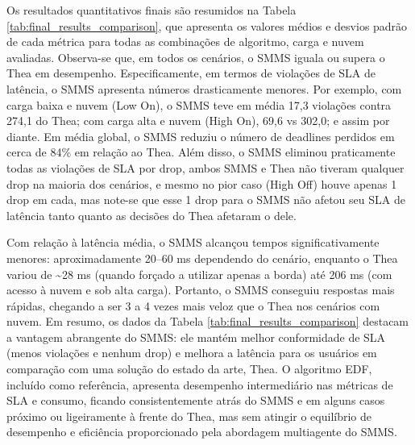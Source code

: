 Os resultados quantitativos finais são resumidos na Tabela \ref{tab:final_results_comparison}, que apresenta os valores médios e desvios padrão de cada métrica para todas as combinações de algoritmo, carga e nuvem avaliadas. Observa-se que, em todos os cenários, o SMMS iguala ou supera o Thea em desempenho. Especificamente, em termos de violações de SLA de latência, o SMMS apresenta números drasticamente menores. Por exemplo, com carga baixa e nuvem (Low On), o SMMS teve em média 17,3 violações contra 274,1 do Thea; com carga alta e nuvem (High On), 69,6 vs 302,0; e assim por diante. Em média global, o SMMS reduziu o número de deadlines perdidos em cerca de 84\% em relação ao Thea. Além disso, o SMMS eliminou praticamente todas as violações de SLA por drop, ambos SMMS e Thea não tiveram qualquer drop na maioria dos cenários, e mesmo no pior caso (High Off) houve apenas 1 drop em cada, mas note-se que esse 1 drop para o SMMS não afetou seu SLA de latência tanto quanto as decisões do Thea afetaram o dele.

Com relação à latência média, o SMMS alcançou tempos significativamente menores: aproximadamente 20–60 ms dependendo do cenário, enquanto o Thea variou de \textasciitilde28 ms (quando forçado a utilizar apenas a borda) até 206 ms (com acesso à nuvem e sob alta carga). Portanto, o SMMS conseguiu respostas mais rápidas, chegando a ser 3 a 4 vezes mais veloz que o Thea nos cenários com nuvem. Em resumo, os dados da Tabela \ref{tab:final_results_comparison} destacam a vantagem abrangente do SMMS: ele mantém melhor conformidade de SLA (menos violações e nenhum drop) e melhora a latência para os usuários em comparação com uma solução do estado da arte, Thea. O algoritmo EDF, incluído como referência, apresenta desempenho intermediário nas métricas de SLA e consumo, ficando consistentemente atrás do SMMS e em alguns casos próximo ou ligeiramente à frente do Thea, mas sem atingir o equilíbrio de desempenho e eficiência proporcionado pela abordagem multiagente do SMMS.

